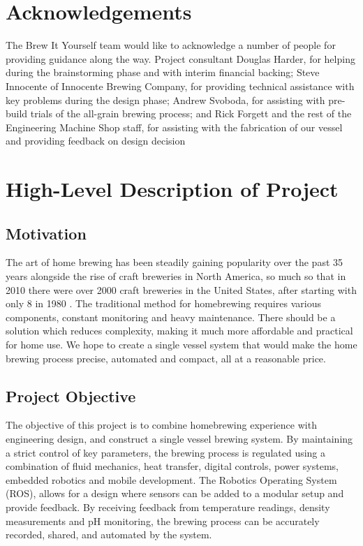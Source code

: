 \documentclass{article}
\begin{document}
\section*{Acknowledgements}
The Brew It Yourself team would like to acknowledge a number of people for providing guidance along the way. Project consultant Douglas Harder, for helping during the brainstorming phase and with interim financial backing; Steve Innocente of Innocente Brewing Company, for providing technical assistance with key problems during the design phase; Andrew Svoboda, for assisting with pre-build trials of the all-grain brewing process; and Rick Forgett and the rest of the Engineering Machine Shop staff, for assisting with the fabrication of our vessel and providing feedback on design decision

\pagebreak

\glsunsetall
\tableofcontents
\pagebreak
\listoffigures
\listoftables
\glsresetall

\pagebreak

\setcounter{section}{0}
\section{High-Level Description of Project}
\subsection{Motivation}
The art of home brewing has been steadily gaining popularity over the past 35 years alongside the rise of craft breweries in North America, so much so that in 2010 there were over 2000 craft breweries in the United States, after starting with only 8 in 1980 \cite{craft-beer}. The traditional method for homebrewing requires various components, constant monitoring and heavy maintenance. There should be a solution which reduces complexity, making it much more affordable and practical for home use. We hope to create a single vessel system that would make the home brewing process precise, automated and compact, all at a reasonable price.
\subsection{Project Objective}
The objective of this project is to combine homebrewing experience with engineering design, and construct a single vessel brewing system. By maintaining a strict control of key parameters, the brewing process is regulated using a combination of fluid mechanics, heat transfer, digital controls, power systems, embedded robotics and mobile development. The Robotics Operating System (ROS), allows for a design where sensors can be added to a modular setup and provide feedback. By receiving feedback from temperature readings, density measurements and pH monitoring, the brewing process can be accurately recorded, shared, and automated by the system. 
\end{document}
